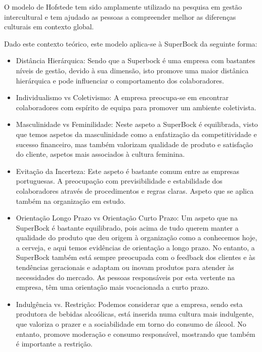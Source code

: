 O modelo de Hofstede tem sido amplamente utilizado na pesquisa em gestão intercultural e tem ajudado as pessoas a compreender melhor as diferenças culturais em contexto global.


Dado este contexto teórico, este modelo aplica-se à SuperBock da seguinte forma:
\noindent \textbf{}
\begin{itemize}

\item Distância Hierárquica: Sendo que a Superbock é uma empresa com bastantes níveis de gestão, devido à sua dimensão, isto promove uma maior distânica hierárquica e pode influenciar o comportamento dos colaboradores.

\item Individualismo vs Coletivismo: A empresa preocupa-se em encontrar colaboradores com espírito de equipa para promover um ambiente coletivista. 

\item Masculinidade vs Feminilidade: Neste aspeto a SuperBock é equilibrada, visto que temos aspetos da masculinidade como a enfatização da competitividade e sucesso financeiro, mas também valorizam qualidade de produto e satisfação do cliente, aspetos mais associados à cultura feminina.

\item Evitação da Incerteza: Este aspeto é bastante comum entre as empresas portuguesas. A preocupação com previsibilidade e estabilidade dos colaboradores através de procedimentos e regras claras. Aspeto que se aplica também na organização em estudo.

\item Orientação Longo Prazo vs Orientação Curto Prazo: Um aspeto que na SuperBock é bastante equilibrado, pois acima de tudo querem manter a qualidade do produto que deu origem à organização como a conhecemos hoje, a cerveja, e aqui temos evidências de orientação a longo prazo. No entanto, a SuperBock também está sempre preocupada com o feedback dos clientes e às tendências geracionais e adaptam ou inovam produtos para atender às necessidades do mercado. As pessoas responsáveis por esta vertente na empresa, têm uma orientação mais vocacionada a curto prazo. 

\item Indulgência vs. Restrição: Podemos considerar que a empresa, sendo esta produtora de bebidas alcoólicas, está inserida numa cultura mais indulgente, que valoriza o prazer e a sociabilidade em torno do consumo de álcool. No entanto, promove moderação e consumo responsável, mostrando que também é importante a restrição.
\end{itemize}

